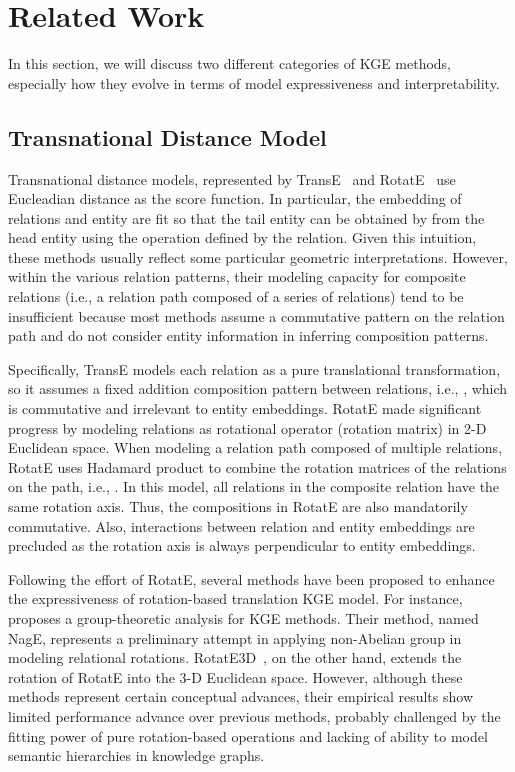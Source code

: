 \documentclass[11pt]{article}
\begin{document}
\section{Related Work}
In this section, we will discuss two different categories of KGE methods, especially how they evolve in terms of model expressiveness and interpretability.

\subsection{Transnational Distance Model}



Transnational distance models, represented by TransE~\cite{bordes2013translating} and RotatE~\cite{sun2019rotate} use Eucleadian distance as the score function. In particular, the embedding of relations and entity are fit so that the tail entity can be obtained by from the head entity using the operation defined by the relation. Given this intuition, these methods usually reflect some particular geometric interpretations. However, within the various relation patterns, their modeling capacity for composite relations (i.e., a relation path composed of a series of relations) tend to be insufficient because most methods assume a commutative pattern on the relation path and do not consider entity information in inferring composition patterns. 

Specifically, TransE models each relation as a pure translational transformation, so it assumes a fixed addition composition pattern between relations, i.e., , which is commutative and irrelevant to entity embeddings. RotatE made significant progress by modeling relations as rotational operator (rotation matrix) in 2-D Euclidean space. When modeling a relation path composed of multiple relations, RotatE uses Hadamard product to combine the rotation matrices of the relations on the path, i.e., . In this model, all relations in the composite relation have the same rotation axis. Thus, the compositions in RotatE are also mandatorily commutative. Also, interactions between relation and entity embeddings are precluded as the rotation axis is always perpendicular to entity embeddings.

Following the effort of RotatE, several methods have been proposed to enhance the expressiveness of rotation-based translation KGE model. For instance,~\cite{Yang2020AGF} proposes a group-theoretic analysis for KGE methods. Their method, named NagE, represents a preliminary attempt in applying non-Abelian group in modeling relational rotations. RotatE3D~\cite{gao2020rotate3d}, on the other hand, extends the rotation of RotatE into the 3-D Euclidean space. However, although these methods represent certain conceptual advances, their empirical results show limited performance advance over previous methods, probably challenged by the fitting power of pure rotation-based operations and lacking of ability to model semantic hierarchies in knowledge graphs. 
\end{document}

